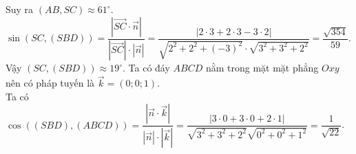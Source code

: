 \begin{ex}
{\begin{itemchoice}
	Suy ra $(AB,SC)\approx 61^\circ$.
	\itemch
	$\sin (SC,(SBD))=\dfrac{\left|\overrightarrow{SC}\cdot\overrightarrow{n} \right| }{\left|\overrightarrow{SC}\right| \cdot \left| \overrightarrow{n} \right|}=\dfrac{\left|2\cdot 3+2\cdot 3-3\cdot 2 \right| }{\sqrt{2^2+2^2+(-3)^2}\cdot \sqrt{3^2+3^2+2^2}}=\dfrac{\sqrt{354}}{59}$.\\
	Vậy $ (SC,(SBD))\approx 19^\circ$.
	\itemch
	Ta có đáy $ABCD$ nằm trong mặt mặt phẳng $Oxy$ nên có pháp tuyến là $\overrightarrow{k}=(0;0;1)$.\\
	Ta có $\cos((SBD),(ABCD))=\dfrac{\left| \overrightarrow{n}\cdot \overrightarrow{k}\right| }{\left| \overrightarrow{n}\right|\cdot \left|\overrightarrow{k} \right|}=\dfrac{\left|3\cdot 0+3\cdot 0+2\cdot 1 \right| }{\sqrt{3^2+3^2+2^2}\sqrt{0^2+0^2+1^2}}=\dfrac{1}{\sqrt{22}}$.
\end{itemchoice}
}
\end{ex}
